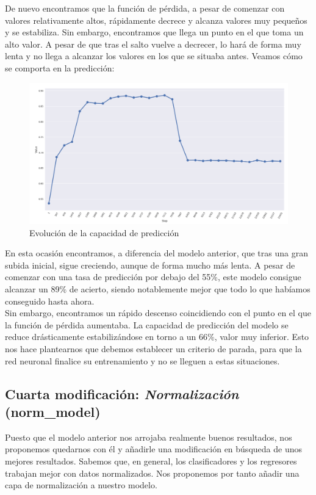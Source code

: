\documentclass[11pt]{article}
\theoremstyle{plain}
\theoremstyle{definition}
\begin{document}
De nuevo encontramos que la función de pérdida, a pesar de comenzar con 
valores relativamente altos, rápidamente decrece y alcanza valores muy 
pequeños y se estabiliza. Sin embargo, encontramos que llega un punto 
en el que toma un alto valor. A pesar de que tras el salto vuelve a 
decrecer, lo hará de forma muy lenta y no llega a alcanzar los valores
en los que se situaba antes. Veamos cómo se comporta en la predicción:

\begin{figure}[H]
  \centering \includegraphics[width=.95\textwidth]{imgs/accuracy_vlr}
  \caption{Evolución de la capacidad de predicción}
\end{figure}

En esta ocasión encontramos, a diferencia del modelo anterior, que tras
una gran subida inicial, sigue creciendo, aunque de forma mucho más lenta.
A pesar de comenzar con una tasa de predicción por debajo del 55\%, este
modelo consigue alcanzar un 89\% de acierto, siendo notablemente mejor que
todo lo que habíamos conseguido hasta ahora.\\

Sin embargo, encontramos un rápido descenso coincidiendo con el punto en 
el que la función de pérdida aumentaba. La capacidad de predicción del 
modelo se reduce drásticamente estabilizándose en torno a un 66\%, valor 
muy inferior. Esto nos hace plantearnos que debemos establecer un criterio
de parada, para que la red neuronal finalice su entrenamiento y no se 
lleguen a estas situaciones.




\subsection{Cuarta modificación: \textit{Normalización} (norm\_model)}

Puesto que el modelo anterior nos arrojaba realmente buenos resultados,
nos proponemos quedarnos con él y añadirle una modificación en búsqueda
de unos mejores resultados. Sabemos que, en general, los clasificadores
y los regresores trabajan mejor con datos normalizados. Nos proponemos
por tanto añadir una capa de normalización a nuestro modelo.\\
\end{document}
